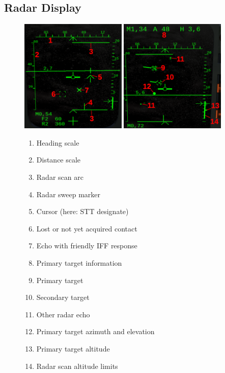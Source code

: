 \subsection{Radar Display}
\begin{figure}[!ht]
  \centering
  \includegraphics[width=0.45\textwidth]{images/displays/MI-radar1.png}
  \includegraphics[width=0.45\textwidth]{images/displays/MI-radar2.png}

  \begin{multicols}{2}
    \begin{enumerate}[nosep]
      \item \label{item:head-scale} Heading scale
      \item \label{item:dist-scale} Distance scale
      \item \label{item:scan-arc} Radar scan arc
      \item \label{item:sweep} Radar sweep marker
      \item \label{item:cursor} Cursor (here: STT designate)
      \item \label{item:lost-lock} Lost or not yet acquired contact
      \item \label{item:friendly} Echo with friendly IFF response
      \item \label{item:target-info} Primary target information
      \item \label{item:primary} Primary target
      \item \label{item:secondary} Secondary target
      \item \label{item:echo} Other radar echo
      \item \label{item:azi-elev} Primary target azimuth and elevation
      \item \label{item:tgt-alt} Primary target altitude
      \item \label{item:vert-scan-arc} Radar scan altitude limits
    \end{enumerate}
  \end{multicols}


\end{figure}
